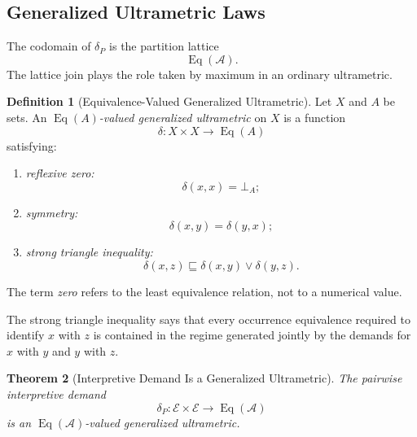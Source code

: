 \documentclass[11pt]{article}
\theoremstyle{plain}
\newtheorem{theorem}{Theorem}[section]
\theoremstyle{definition}
\newtheorem{definition}[theorem]{Definition}
\theoremstyle{remark}
\begin{document}
\subsection{Generalized Ultrametric Laws}

The codomain of \(\delta_P\)
is the partition lattice
\[
  \operatorname{Eq}(\mathcal{A}).
\]
The lattice join plays the role
taken by maximum in an ordinary ultrametric.

\begin{definition}[Equivalence-Valued Generalized Ultrametric]
  \label{ik.def.generalized-ultrametric}
  Let \(X\) and \(A\) be sets.
  An
  \emph{\(\operatorname{Eq}(A)\)-valued generalized ultrametric}
  on \(X\)
  is a function
  \[
    \delta:
    X\times X
    \longrightarrow
    \operatorname{Eq}(A)
  \]
  satisfying:
  \begin{enumerate}[label=(U\arabic*)]
    \item \emph{reflexive zero:}
          \[
            \delta(x,x)
            =
            \bot_A;
          \]
    \item \emph{symmetry:}
          \[
            \delta(x,y)
            =
            \delta(y,x);
          \]
    \item \emph{strong triangle inequality:}
          \[
            \delta(x,z)
            \sqsubseteq
            \delta(x,y)
            \vee
            \delta(y,z).
          \]
  \end{enumerate}
\end{definition}

The term \emph{zero}
refers to the least equivalence relation,
not to a numerical value.

The strong triangle inequality says that
every occurrence equivalence required
to identify \(x\) with \(z\)
is contained in the regime generated jointly
by the demands for \(x\) with \(y\)
and \(y\) with \(z\).

\begin{theorem}[Interpretive Demand Is a Generalized Ultrametric]
  \label{ik.thm.demand-ultrametric}
  The pairwise interpretive demand
  \[
    \delta_P:
    \mathcal{E}\times\mathcal{E}
    \longrightarrow
    \operatorname{Eq}(\mathcal{A})
  \]
  is an
  \(\operatorname{Eq}(\mathcal{A})\)-valued
  generalized ultrametric.
\end{theorem}
\end{document}
